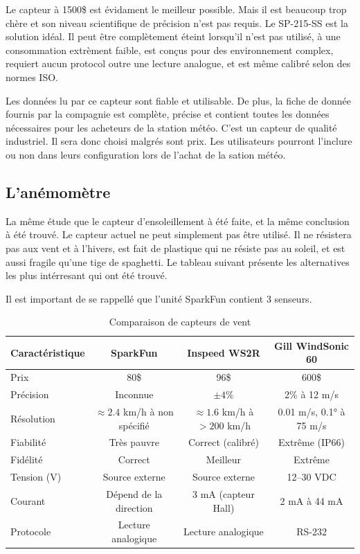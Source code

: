 Le capteur à 1500\$ est évidament le meilleur possible. Mais il est beaucoup trop chère et son niveau scientifique de précision n'est
pas requis. Le SP-215-SS est la solution idéal. Il peut être complètement éteint lorsqu'il n'est pas utilisé, à une consommation extrèment
faible, est conçus pour des environnement complex, requiert aucun protocol outre une lecture analogue, et est même calibré selon des normes ISO.

Les données lu par ce capteur sont fiable et utilisable. De plus, la fiche de donnée fournis par la compagnie est complète, précise et contient
toutes les données nécessaires pour les acheteurs de la station météo. C'est un capteur de qualité industriel. Il sera donc choisi malgrés sont
prix. Les utilisateurs pourront l'inclure ou non dans leurs configuration lors de l'achat de la sation météo.

\subsection{L'anémomètre}
La même étude que le capteur d'ensoleillement à été faite, et la même conclusion à été trouvé.
Le capteur actuel ne peut simplement pas être utilisé. Il ne résistera pas aux vent et à l'hivers, est fait de plastique qui ne résiste pas
au soleil, et est aussi fragile qu'une tige de spaghetti.
Le tableau suivant présente les alternatives les plus intérresant qui ont été trouvé.

Il est important de se rappellé que l'unité SparkFun contient 3 senseurs.

\begin{table}[h]
\centering
\small
\begin{tabular}{|l|c|c|c|}
\hline
\textbf{Caractéristique} & \textbf{SparkFun} & \textbf{Inspeed WS2R} & \textbf{Gill WindSonic 60} \\
\hline
Prix & 80\$ & 96\$ & 600\$ \\
\hline
Précision & Inconnue & $\pm 4\%$ & 2\% à 12 m/s \\
\hline
Résolution & $\approx 2.4$ km/h à non spécifié & $\approx 1.6$ km/h à $>200$ km/h & 0.01 m/s, 0.1° à 75 m/s \\
\hline
Fiabilité & Très pauvre & Correct (calibré) & Extrême (IP66) \\
\hline
Fidélité & Correct & Meilleur & Extrême \\
\hline
Tension (V) & Source externe & Source externe & 12--30 VDC \\
\hline
Courant & Dépend de la direction & 3 mA (capteur Hall) & 2 mA à 44 mA \\
\hline
Protocole & Lecture analogique & Lecture analogique & RS-232 \\
\hline
\end{tabular}
\caption{Comparaison de capteurs de vent}
\label{tab:wind_sensors}
\end{table}

